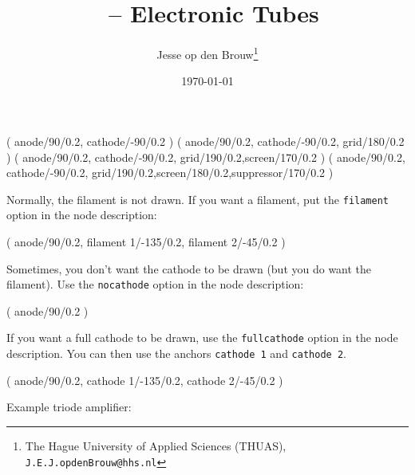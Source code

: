 \documentclass[a4paper]{article}
\author{Jesse op den Brouw\thanks{The Hague University of Applied Sciences (THUAS), \texttt{J.E.J.opdenBrouw@hhs.nl}}}
\title{\Circuitikz\ -- Electronic Tubes}
\date{\today}
\begin{document}
\maketitle



\begin{groupdesc}
	 ( anode/90/0.2, cathode/-90/0.2 )
	 ( anode/90/0.2, cathode/-90/0.2, grid/180/0.2 )
	 ( anode/90/0.2, cathode/-90/0.2, grid/190/0.2,screen/170/0.2 )
	 ( anode/90/0.2, cathode/-90/0.2, grid/190/0.2,screen/180/0.2,suppressor/170/0.2 )
\end{groupdesc}

Normally, the filament is not drawn. If you want a filament, put the \verb|filament| option in the node description:

\begin{groupdesc}
	 ( anode/90/0.2, filament 1/-135/0.2, filament 2/-45/0.2 )
\end{groupdesc}

Sometimes, you don't want the cathode to be drawn (but you do want the filament). Use the \verb|nocathode| option in the node description:

\begin{groupdesc}
	 ( anode/90/0.2 )
\end{groupdesc}

If you want a full cathode to be drawn, use the \verb|fullcathode| option in the node description. You can then use the anchors \verb|cathode 1| and \verb|cathode 2|.

\begin{groupdesc}
	 ( anode/90/0.2, cathode 1/-135/0.2, cathode 2/-45/0.2 )
\end{groupdesc}

Example triode amplifier:
\end{document}
